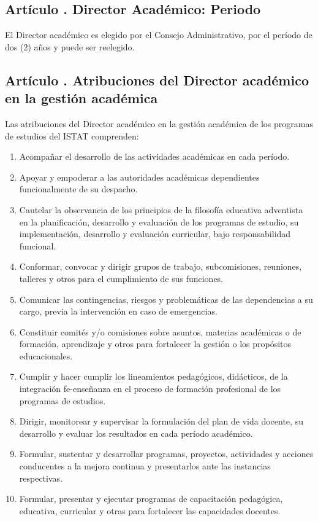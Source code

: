 \subsection{Artículo . Director Académico: Periodo}
\addtocounter{ns}{1}
El Director académico es elegido por el Consejo Administrativo, por el período de dos (2) años y puede ser reelegido.
\subsection{Artículo . Atribuciones del Director académico en la gestión académica}
\addtocounter{ns}{1}
Las atribuciones del Director académico en la gestión académica de los programas de estudios del ISTAT comprenden: 
\begin{enumerate}
\item Acompañar el desarrollo de las actividades académicas en cada período. 
\item Apoyar y empoderar a las autoridades académicas dependientes funcionalmente de su despacho. 
\item Cautelar la observancia de los principios de la filosofía educativa adventista en la planificación, desarrollo y evaluación de los programas de estudio, su implementación, desarrollo y evaluación curricular, bajo responsabilidad funcional. 
\item Conformar, convocar y dirigir grupos de trabajo, subcomisiones, reuniones, talleres y otros para el cumplimiento de sus funciones. 
\item Comunicar las contingencias, riesgos y problemáticas de las dependencias a su cargo, previa la intervención en caso de emergencias. 
\item Constituir comités y/o comisiones sobre asuntos, materias académicas o de formación, aprendizaje y otros para fortalecer la gestión o los propósitos educacionales. 
\item Cumplir y hacer cumplir los lineamientos pedagógicos, didácticos, de la integración fe-enseñanza en el proceso de formación profesional de los programas de estudios. 
\item Dirigir, monitorear y supervisar la formulación del plan de vida docente, su desarrollo y evaluar los resultados en cada período académico. 
\item Formular, sustentar y desarrollar programas, proyectos, actividades y acciones conducentes a la mejora continua y presentarlos ante las instancias respectivas. 
\item Formular, presentar y ejecutar programas de capacitación pedagógica, educativa, curricular y otras para fortalecer las capacidades docentes. 

\end{enumerate}

